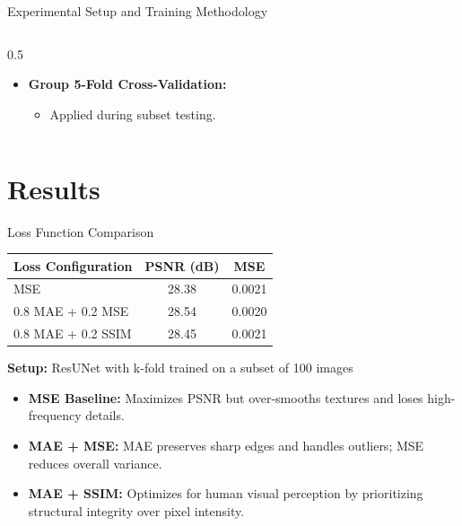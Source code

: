 \documentclass[10pt, handout]{beamer}
\begin{document}
\begin{frame}{Experimental Setup and Training Methodology}
\begin{columns}[T]
\begin{column}{0.5\textwidth}
\begin{itemize}
                \vspace{0.2cm}
                \item \textbf{Group 5-Fold Cross-Validation:} 
                \begin{itemize}
                    \item Applied during subset testing.
                \end{itemize}
            \end{itemize}
        \end{column}

    \end{columns}
\end{frame}


\section{Results}

\begin{frame}{Loss Function Comparison}
    \vspace{0.2cm}
    
    \begin{table}[]
        \centering
        \renewcommand{\arraystretch}{1.3}
        \begin{tabular}{lcc}
            \toprule
            \textbf{Loss Configuration} & \textbf{PSNR (dB)} & \textbf{MSE} \\
            \midrule
            MSE                 & 28.38 & 0.0021 \\
            0.8 MAE + 0.2 MSE   & 28.54 & 0.0020 \\
            0.8 MAE + 0.2 SSIM  & 28.45 & 0.0021 \\
            \bottomrule
        \end{tabular}
    \end{table}
    \textbf{Setup:} ResUNet with k-fold trained on a subset of 100 images

    \vspace{0.4cm}
    \begin{itemize}
        \item \textbf{MSE Baseline:} Maximizes PSNR but over-smooths textures and loses high-frequency details.
        \item \textbf{MAE + MSE:} MAE preserves sharp edges and handles outliers; MSE reduces overall variance.
        \item \textbf{MAE + SSIM:} Optimizes for human visual perception by prioritizing structural integrity over pixel intensity.
    \end{itemize}
\end{frame}
\end{document}
